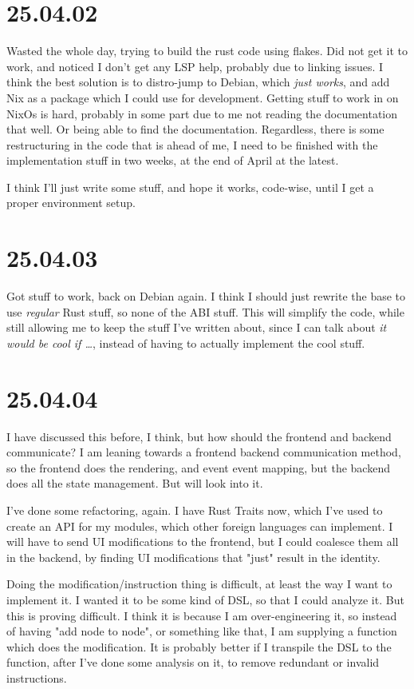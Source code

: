 \section{25.04.02}

Wasted the whole day, trying to build the rust code using flakes. Did not get it
to work, and noticed I don't get any LSP help, probably due to linking issues. I
think the best solution is to distro-jump to Debian, which \textit{just works},
and add Nix as a package which I could use for development. Getting stuff to
work in on NixOs is hard, probably in some part due to me not reading the
documentation that well. Or being able to find the documentation.
Regardless, there is some restructuring in the code that is ahead of me, I need
to be finished with the implementation stuff in two weeks, at the end of April
at the latest.

I think I'll just write some stuff, and hope it works, code-wise, until I get a
proper environment setup.

\section{25.04.03}

Got stuff to work, back on Debian again. I think I should just rewrite the base
to use \textit{regular} Rust stuff, so none of the ABI stuff. This will simplify
the code, while still allowing me to keep the stuff I've written about, since I
can talk about \textit{it would be cool if \dots}, instead of having to actually
implement the cool stuff.

\section{25.04.04}

I have discussed this before, I think, but how should the frontend and backend
communicate? I am leaning towards a frontend \to backend communication method,
so the frontend does the rendering, and event \to event mapping, but the backend
does all the state management. But will look into it.

I've done some refactoring, again. I have Rust Traits now, which I've used to
create an API for my modules, which other foreign languages can implement. I
will have to send UI modifications to the frontend, but I could coalesce them
all in the backend, by finding UI modifications that "just" result in the
identity.

Doing the modification/instruction thing is difficult, at least the way I want
to implement it. I wanted it to be some kind of DSL, so that I could analyze it.
But this is proving difficult. I think it is because I am over-engineering it,
so instead of having "add node to node", or something like that, I am supplying
a function which does the modification. It is probably better if I transpile the
DSL to the function, after I've done some analysis on it, to remove redundant or
invalid instructions.

